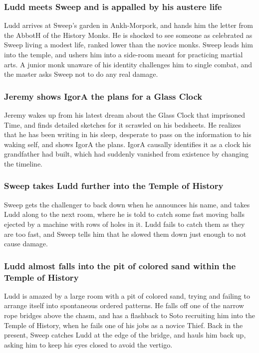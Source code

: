 \subsubsection{\Gls{Ludd} meets \Gls{Sweep} and is appalled by his austere life}
\Gls{Ludd} arrives at \Gls{Sweep}'s garden in Ankh-Morpork, and hands him the letter from the
\Gls{AbbotH} of the History Monks. He is shocked to see someone as celebrated as \Gls{Sweep} living
a modest life, ranked lower than the novice monks. \Gls{Sweep} leads him into the temple, and ushers
him into a side-room meant for practicing martial arts. A junior monk unaware of his identity
challenges him to single combat, and the master asks \Gls{Sweep} not to do any real damage.

\subsubsection{\Gls{Jeremy} shows \Gls{IgorA} the plans for a Glass Clock}
\Gls{Jeremy} wakes up from his latest dream about the Glass Clock that imprisoned \Gls{Time}, and
finds detailed sketches for it scrawled on his bedsheets. He realizes that he has been writing in
his sleep, desperate to pass on the information to his waking self, and shows \Gls{IgorA} the plans.
\Gls{IgorA} causally identifies it as a clock his grandfather had built, which had suddenly vanished
from existence by changing the timeline.

\subsubsection{\Gls{Sweep} takes \Gls{Ludd} further into the Temple of History}
\Gls{Sweep} gets the challenger to back down when he announces his name, and takes \Gls{Ludd} along
to the next room, where he is told to catch some fast moving balls ejected by a machine with rows
of holes in it. \Gls{Ludd} fails to catch them as they are too fast, and \Gls{Sweep} tells him that
he slowed them down just enough to not cause damage.

\subsubsection{\Gls{Ludd} almost falls into the pit of colored sand within the Temple of History}
\Gls{Ludd} is amazed by a large room with a pit of colored sand, trying and failing to arrange
itself into spontaneous ordered patterns. He falls off one of the narrow rope bridges above the
chasm, and has a flashback to \Gls{Soto} recruiting him into the Temple of History, when he fails
one of his jobs as a novice Thief. Back in the present, \Gls{Sweep} catches \Gls{Ludd} at the
edge of the bridge, and hauls him back up, asking him to keep his eyes closed to avoid the vertigo.

